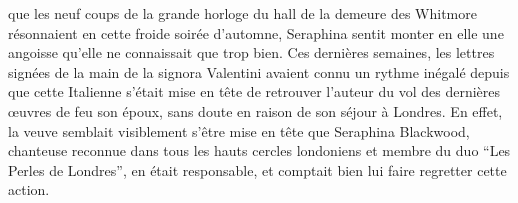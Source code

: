 




 que les neuf coups de la grande horloge du hall de la demeure des Whitmore résonnaient en cette froide soirée d'automne, Seraphina sentit monter en elle une angoisse qu'elle ne connaissait que trop bien.
Ces dernières semaines, les lettres signées de la main de la signora Valentini avaient connu un rythme inégalé depuis que cette Italienne s’était mise en tête de retrouver l’auteur du vol des dernières œuvres de feu son époux, sans doute en raison de son séjour à Londres.
En effet, la veuve semblait visiblement s'être mise en tête que Seraphina Blackwood, chanteuse reconnue dans tous les hauts cercles londoniens et membre du duo \enquote{Les Perles de Londres}, en était responsable, et comptait bien lui faire regretter cette action.

